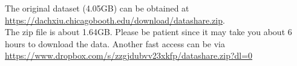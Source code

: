 \documentclass[11pt]{article}
\begin{document}
The original dataset (4.05GB) can be obtained at \\ 
\url{https://dachxiu.chicagobooth.edu/download/datashare.zip}. \\
The zip file is about 1.64GB. Please be patient since it may take you about 6 hours to download the data. Another fast access can be via \\
\url{https://www.dropbox.com/s/zzgjdubvv23xkfp/datashare.zip?dl=0}









\end{document}
